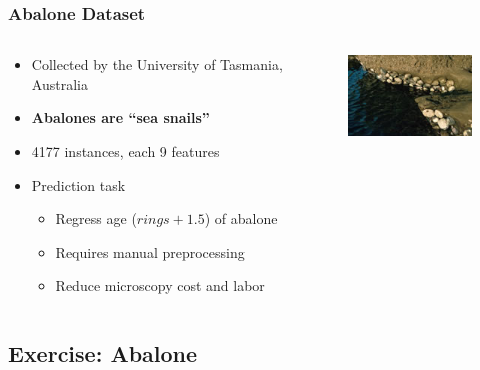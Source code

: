 \documentclass[aspectratio=1610]{beamer}
\newcommand\imageright[1]{ %
    \caption*{\scalebox{.5}{\textcolor{lightgray}{\textcopyright~#1}}} %
}
\begin{document}
\begin{frame}
\frametitle{Abalone Dataset}

\begin{columns}
    \begin{column}{0.48\textwidth}
        \begin{itemize}
            \item Collected by the University of Tasmania, Australia
            \item \textbf{Abalones are ``sea snails''}
            \item 4177 instances, each 9 features
            \item Prediction task
            \begin{itemize}
                \item Regress age ($rings + 1.5$) of abalone
                \item Requires manual preprocessing
                \item Reduce microscopy cost and labor
            \end{itemize}
        \end{itemize}
    \end{column}
    \begin{column}{0.48\textwidth}
        \begin{figure}
            \centering
            \includegraphics[width=0.8\linewidth]{abalone2.jpg}
            \imageright{UCI Machine Learning Repository}
        \end{figure}
    \end{column}
\end{columns}
\end{frame}

\subsection{Exercise: Abalone}
\label{subsec:regression-exercise}
\end{document}
